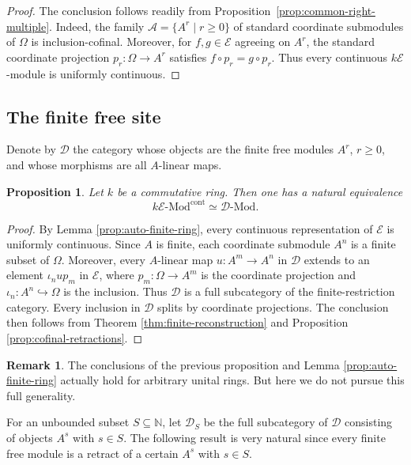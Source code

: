 \documentclass[10pt, reqno]{amsart}
\theoremstyle{plain}
\newtheorem{proposition}[theorem]{Proposition}
\numberwithin{equation}{section}
\theoremstyle{definition}
\newtheorem{remark}[theorem]{Remark}
\newcommand{\Mod}{{\textrm{-}\mathrm{Mod}}}
\newcommand{\E}{\mathscr E}
\newcommand{\D}{\mathscr D}
\begin{document}
\begin{proof}
The conclusion follows readily from Proposition~\ref{prop:common-right-multiple}. Indeed, the family $\mathcal{A} = \{ A^r \mid r \geqslant 0\}$ of standard coordinate submodules of $\Omega$ is inclusion-cofinal. Moreover, for $f, g \in \E$ agreeing on $A^r$, the standard coordinate projection $p_r: \Omega \to A^r$ satisfies $f \circ p_r = g \circ p_r$. Thus every continuous $k\E$-module is uniformly continuous.
\end{proof}


\subsection{The finite free site}

Denote by $\D$ the category whose objects are the finite free modules $A^r$, $r \geqslant 0$, and whose morphisms are all $A$-linear maps.

\begin{proposition}\label{finite-ring-reconstruction}
Let $k$ be a commutative ring. Then one has a natural equivalence
\[
k\E \Mod^{\mathrm{cont}} \simeq \D \Mod.
\]
\end{proposition}

\begin{proof}
By Lemma \ref{prop:auto-finite-ring}, every continuous representation of $\E$ is uniformly continuous. Since $A$ is finite, each coordinate submodule $A^n$ is a finite subset of $\Omega$. Moreover, every $A$-linear map $u: A^m \to A^n$ in $\D$ extends to an element $\iota_n u p_m$ in $\E$, where $p_m: \Omega \to A^m$ is the coordinate projection and $\iota_n: A^n \hookrightarrow \Omega$ is the inclusion. Thus $\D$ is a full subcategory of the finite-restriction category. Every inclusion in $\D$ splits by coordinate projections. The conclusion then follows from Theorem \ref{thm:finite-reconstruction} and Proposition \ref{prop:cofinal-retractions}.
\end{proof}

\begin{remark}
The conclusions of the previous proposition and Lemma \ref{prop:auto-finite-ring} actually hold for arbitrary unital rings. But here we do not pursue this full generality.
\end{remark}

For an unbounded subset $S \subseteq \mathbb N$, let $\D_S$ be the full subcategory of $\D$ consisting of objects $A^s$ with $s \in S$. The following result is very natural since every finite free module is a retract of a certain $A^s$ with $s \in S$.
\end{document}
